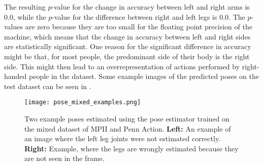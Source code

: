 The resulting $p$-value for the change in accuracy between left and right arms is $0.0$, while the $p$-value for the difference between right and left legs is $0.0$.
The $p$-values are zero because they are too small for the floating point precision of the machine, which means that the change in accuracy between left and right sides are statistically significant.
One reason for the significant difference in accuracy might be that, for most people, the predominant side of their body is the right side.
This might then lead to an overrepresentation of actions performed by right-handed people in the dataset.
Some example images of the predicted poses on the test dataset can be seen in .

\begin{figure}[htb!]
    \centering
    \texttt{[image: pose\_mixed\_examples.png]}
    \caption{Two example poses estimated using the pose estimator trained on the mixed dataset of MPII and Penn Action. \textbf{Left:} An example of an image where the left leg joints were not estimated correctly. \textbf{Right:} Example, where the legs are wrongly estimated because they are not seen in the frame.}
    \label{fig:pose_mixed_examples}
\end{figure}


\begin{table}[]
    \small
    \centering
    \caption{Per joint accuracy, computed on the Penn Action test set using PCK @ 0.1 measure. In addition, aggregated accuracy values are given in the third row for different sets of joints. \textit{Arms} for both left and right are computed by taking the average of the shoulder, elbow and wrist accuracies. \textit{Legs} are computed the same way, using knee, ankle and hip accuracy values. For \textit{Upper body}, the upper neck is added to \textit{Arms (both)}.}
    \label{tab:pose-mixed-perjoint}
\end{table}


